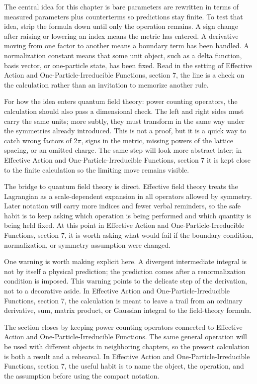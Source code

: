 The central idea for this chapter is bare parameters are rewritten in terms of measured parameters plus counterterms so predictions stay finite.  To test that idea, strip the formula down until only the operation remains.  A sign change after raising or lowering an index means the metric has entered.  A derivative moving from one factor to another means a boundary term has been handled.  A normalization constant means that some unit object, such as a delta function, basis vector, or one-particle state, has been fixed.  Read in the setting of Effective Action and One-Particle-Irreducible Functions, section 7, the line is a check on the calculation rather than an invitation to memorize another rule.

For how the idea enters quantum field theory: power counting operators, the calculation should also pass a dimensional check.  The left and right sides must carry the same units; more subtly, they must transform in the same way under the symmetries already introduced.  This is not a proof, but it is a quick way to catch wrong factors of \(2\pi\), signs in the metric, missing powers of the lattice spacing, or an omitted charge.  The same step will look more abstract later; in Effective Action and One-Particle-Irreducible Functions, section 7 it is kept close to the finite calculation so the limiting move remains visible.

The bridge to quantum field theory is direct.  Effective field theory treats the Lagrangian as a scale-dependent expansion in all operators allowed by symmetry.  Later notation will carry more indices and fewer verbal reminders, so the safe habit is to keep asking which operation is being performed and which quantity is being held fixed.  At this point in Effective Action and One-Particle-Irreducible Functions, section 7, it is worth asking what would fail if the boundary condition, normalization, or symmetry assumption were changed.

One warning is worth making explicit here.  A divergent intermediate integral is not by itself a physical prediction; the prediction comes after a renormalization condition is imposed.  This warning points to the delicate step of the derivation, not to a decorative aside.  In Effective Action and One-Particle-Irreducible Functions, section 7, the calculation is meant to leave a trail from an ordinary derivative, sum, matrix product, or Gaussian integral to the field-theory formula.

The section closes by keeping power counting operators connected to Effective Action and One-Particle-Irreducible Functions.  The same general operation will be used with different objects in neighboring chapters, so the present calculation is both a result and a rehearsal.  In Effective Action and One-Particle-Irreducible Functions, section 7, the useful habit is to name the object, the operation, and the assumption before using the compact notation.



